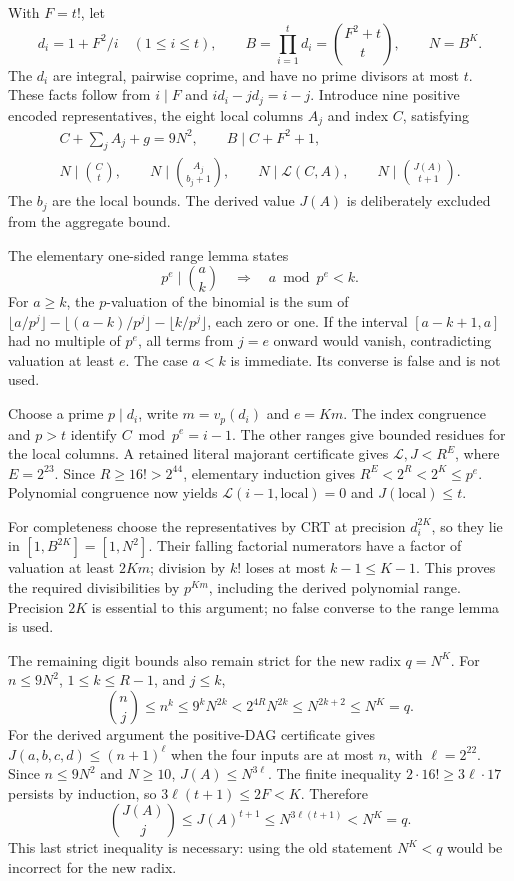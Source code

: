 With $F=t!$, let
\[
 d_i=1+F^2/i\quad(1\le i\le t),\qquad
 B=\prod_{i=1}^{t}d_i=\binom{F^2+t}{t},\qquad N=B^K.
\]
The $d_i$ are integral, pairwise coprime, and have no prime divisors at
most $t$. These facts follow from $i\mid F$ and
$id_i-jd_j=i-j$. Introduce nine positive encoded representatives,
the eight local columns $A_j$ and index $C$, satisfying
\begin{equation}\label{eq:direct-crt-system}
 \begin{gathered}
 C+\sum_j A_j+g=9N^2,\qquad B\mid C+F^2+1,\\
 N\mid\binom Ct,\qquad N\mid\binom{A_j}{b_j+1},\qquad
 N\mid\mathcal L(C,A),\qquad N\mid\binom{J(A)}{t+1}.
 \end{gathered}
\end{equation}
The $b_j$ are the local bounds. The derived value $J(A)$ is deliberately
excluded from the aggregate bound.

The elementary one-sided range lemma states
\[
             p^e\mid\binom ak\quad\Longrightarrow\quad
                         a\bmod p^e<k.
\]
For $a\ge k$, the $p$-valuation of the binomial is the sum of
$\lfloor a/p^j\rfloor-\lfloor(a-k)/p^j\rfloor-\lfloor k/p^j\rfloor$,
each zero or one. If the interval $[a-k+1,a]$ had no multiple of $p^e$,
all terms from $j=e$ onward would vanish, contradicting valuation at
least $e$. The case $a<k$ is immediate. Its converse is false and is not
used.

Choose a prime $p\mid d_i$, write $m=v_p(d_i)$ and $e=Km$. The index
congruence and $p>t$ identify $C\bmod p^e=i-1$. The other ranges give
bounded residues for the local columns. A retained literal majorant
certificate gives $\mathcal L,J<R^E$, where $E=2^{23}$. Since
$R\ge16!>2^{44}$, elementary induction gives
$R^E<2^R<2^K\le p^e$. Polynomial congruence now yields
$\mathcal L(i-1,\text{local})=0$ and $J(\text{local})\le t$.

For completeness choose the representatives by CRT at precision
$d_i^{2K}$, so they lie in $[1,B^{2K}]=[1,N^2]$. Their falling factorial
numerators have a factor of valuation at least $2Km$; division by $k!$
loses at most $k-1\le K-1$. This proves the required divisibilities by
$p^{Km}$, including the derived polynomial range. Precision $2K$ is
essential to this argument; no false converse to the range lemma is used.

The remaining digit bounds also remain strict for the new radix $q=N^K$.
For $n\le9N^2$, $1\le k\le R-1$, and $j\le k$,
\[
 \binom nj\le n^k\le9^kN^{2k}
      <2^{4R}N^{2k}\le N^{2k+2}\le N^K=q.
\]
For the derived argument the positive-DAG certificate gives
$J(a,b,c,d)\le(n+1)^\ell$ when the four inputs are at most $n$,
with $\ell=2^{22}$. Since $n\le9N^2$ and $N\ge10$, $J(A)\le N^{3\ell}$.
The finite inequality $2\cdot16!\ge3\ell\cdot17$ persists by induction,
so $3\ell(t+1)\le2F<K$. Therefore
\[
 \binom{J(A)}j\le J(A)^{t+1}
                  \le N^{3\ell(t+1)}<N^K=q.
\]
This last strict inequality is necessary: using the old statement
$N^K<q$ would be incorrect for the new radix.

